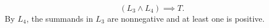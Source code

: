 \[
  (L_3 \land L_4) \implies T.
\]
By \(L_4\), the summands in \(L_3\) are nonnegative and at least one is positive.
